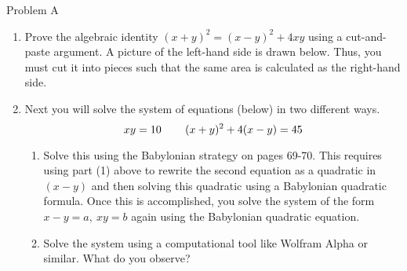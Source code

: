 \documentclass[12pt]{article}
\begin{document}
Problem A
\begin{enumerate}
\item Prove the algebraic identity $\displaystyle{(x+y)^2=(x-y)^2+4xy}$ using a cut-and-paste argument. A picture of the left-hand side is drawn below. Thus, you must cut it into pieces such that the same area is calculated as the right-hand side.\\


\vfill
\item Next you will solve the system of equations (below) in two different ways.\\
$$xy=10 \hspace{.3in} (x+y)^2+4(x-y)=45$$
	\begin{enumerate}
	\item Solve this using the Babylonian strategy on pages 69-70. This requires using part (1) above to rewrite the second equation as a quadratic in $(x-y)$ and then solving this quadratic using a Babylonian quadratic formula. Once this is accomplished, you solve the system of the form $ x-y=a, \: xy=b$ again using the Babylonian quadratic equation.
	\vfill
	\item Solve the system using a computational tool like Wolfram Alpha or similar. What do you observe?
	\vfill
	\end{enumerate}
\end{enumerate}
\end{document}
